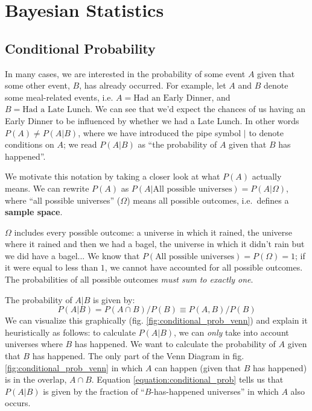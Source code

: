 \documentclass[]{article}
\begin{document}
\section{Bayesian Statistics}

\subsection{Conditional Probability}
In many cases, we are interested in the probability of some event $A$ given that some other event, $B$, has already occurred. For example, let $A$ and $B$ denote some meal-related events, i.e. $A=\text{Had an Early Dinner}$, and $B=\text{Had a Late Lunch}$. We can see that we'd expect the chances of us having an Early Dinner to be influenced by whether we had a Late Lunch. In other words $P(A) \neq P(A|B)$, where we have introduced the pipe symbol $|$ to denote conditions on $A$; we read $P(A|B)$ as ``the probability of $A$ given that $B$ has happened''.

We motivate this notation by taking a closer look at what $P(A)$ actually means. We can rewrite $P(A)$ as $P(A|\text{All possible universes})=P(A|\Omega)$, where ``all possible universes'' ($\Omega$) means all possible outcomes, i.e.\ defines a \textbf{sample space}. 

$\Omega$ includes every possible outcome: a universe in which it rained, the universe where it rained and then we had a bagel, the universe in which it didn't rain but we did have a bagel... We know that $P(\text{All possible universes})=P(\Omega)=1$; if it were equal to less than $1$, we cannot have accounted for all possible outcomes. The probabilities of all possible outcomes \textit{must sum to exactly one}.

The probability of $A|B$ is given by:
\begin{equation}\label{equation:conditional_prob}
    P(A|B) = P(A \cap B)/P(B) \equiv P(A,B)/P(B)
\end{equation}
We can visualize this graphically (fig. \ref{fig:conditional_prob_venn}) and explain it heuristically as follows: to calculate $P(A|B)$, we can \textit{only} take into account universes where $B$ has happened. We want to calculate the probability of $A$ given that $B$ has happened. The only part of the Venn Diagram in fig. \ref{fig:conditional_prob_venn} in which $A$ can happen (given that $B$ has happened) is in the overlap, $A\cap B$. Equation \ref{equation:conditional_prob} tells us that $P(A|B)$ is given by the fraction of ``$B$-has-happened universes'' in which $A$ also occurs.
\end{document}
